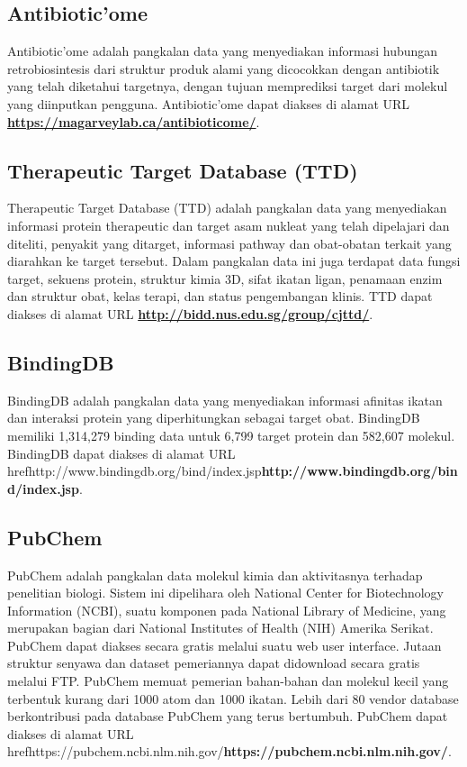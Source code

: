 	\subsection{Antibiotic'ome} \label{antibioticome}
	Antibiotic'ome adalah pangkalan data yang menyediakan informasi hubungan retrobiosintesis dari struktur produk alami yang dicocokkan dengan antibiotik yang telah diketahui targetnya, dengan tujuan memprediksi target dari molekul yang diinputkan pengguna. Antibiotic'ome dapat diakses di alamat URL \href{https://magarveylab.ca/antibioticome/}{\textbf{https://magarveylab.ca/antibioticome/}}.

	\subsection{Therapeutic Target Database (TTD)} \label{ttd}
	Therapeutic Target Database (TTD) adalah pangkalan data yang menyediakan informasi protein therapeutic dan target asam nukleat yang telah dipelajari dan diteliti, penyakit yang ditarget, informasi pathway dan obat-obatan terkait yang diarahkan ke target tersebut. Dalam pangkalan data ini juga terdapat data fungsi target, sekuens protein, struktur kimia 3D, sifat ikatan ligan, penamaan enzim dan struktur obat, kelas terapi, dan status pengembangan klinis. TTD dapat diakses di alamat URL \href{http://bidd.nus.edu.sg/group/cjttd/}{\textbf{http://bidd.nus.edu.sg/group/cjttd/}}.

	\subsection{BindingDB} \label{binding_db}
	BindingDB adalah pangkalan data yang menyediakan informasi afinitas ikatan dan interaksi protein yang diperhitungkan sebagai target obat. BindingDB memiliki 1,314,279 binding data untuk 6,799 target protein dan 582,607 molekul. BindingDB dapat diakses di alamat URL href{http://www.bindingdb.org/bind/index.jsp}{\textbf{http://www.bindingdb.org/bind/index.jsp}}.

	\subsection{PubChem} \label{pubchem}
	PubChem adalah pangkalan data molekul kimia dan aktivitasnya terhadap penelitian biologi. Sistem ini dipelihara oleh National Center for Biotechnology Information (NCBI), suatu komponen pada National Library of Medicine, yang merupakan bagian dari National Institutes of Health (NIH) Amerika Serikat. PubChem dapat diakses secara gratis melalui suatu web user interface. Jutaan struktur senyawa dan dataset pemeriannya dapat didownload secara gratis melalui FTP. PubChem memuat pemerian bahan-bahan dan molekul kecil yang terbentuk kurang dari 1000 atom dan 1000 ikatan. Lebih dari 80 vendor database berkontribusi pada database PubChem yang terus bertumbuh. PubChem dapat diakses di alamat URL href{https://pubchem.ncbi.nlm.nih.gov/}{\textbf{https://pubchem.ncbi.nlm.nih.gov/}}.

